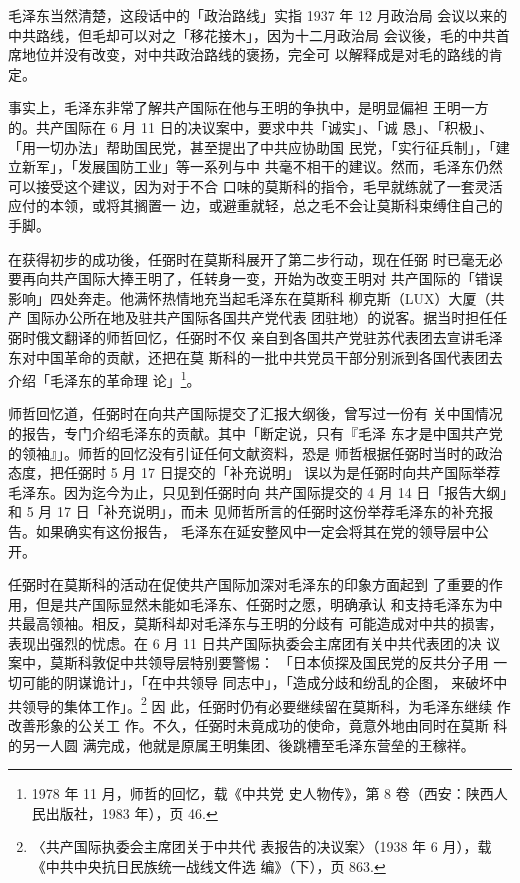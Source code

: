 毛泽东当然清楚，这段话中的「政治路线」实指 1937 年 12 月政治局
会议以来的中共路线，但毛却可以对之「移花接木」，因为十二月政治局
会议後，毛的中共首席地位并没有改变，对中共政治路线的褒扬，完全可
以解释成是对毛的路线的肯定。

事实上，毛泽东非常了解共产国际在他与王明的争执中，是明显偏袒
王明一方的。共产国际在 6 月 11 日的决议案中，要求中共「诚实」、「诚
恳」、「积极」、「用一切办法」帮助国民党，甚至提出了中共应协助国
民党，「实行征兵制」，「建立新军」，「发展国防工业」等一系列与中
共毫不相干的建议。然而，毛泽东仍然可以接受这个建议，因为对于不合
口味的莫斯科的指令，毛早就练就了一套灵活应付的本领，或将其搁置一
边，或避重就轻，总之毛不会让莫斯科束缚住自己的手脚。

在获得初步的成功後，任弼时在莫斯科展开了第二步行动，现在任弼 时已毫无必
要再向共产国际大捧王明了，任转身一变，开始为改变王明对 共产国际的「错误
影响」四处奔走。他满怀热情地充当起毛泽东在莫斯科 柳克斯（LUX）大厦（共产
国际办公所在地及驻共产国际各国共产党代表 团驻地）的说客。据当时担任任
弼时俄文翻译的师哲回忆，任弼时不仅 亲自到各国共产党驻苏代表团去宣讲毛泽
东对中国革命的贡献，还把在莫 斯科的一批中共党员干部分别派到各国代表团去
介绍「毛泽东的革命理 论」\footnote{1978 年 11 月，师哲的回忆，载《中共党
史人物传》，第 8 卷（西安：陕西人民出版社，1983 年），页 46.}。

师哲回忆道，任弼时在向共产国际提交了汇报大纲後，曾写过一份有
关中国情况的报告，专门介绍毛泽东的贡献。其中「断定说，只有『毛泽
东才是中国共产党的领袖』」。师哲的回忆没有引证任何文献资料，恐是
师哲根据任弼时当时的政治态度，把任弼时 5 月 17 日提交的「补充说明」
误以为是任弼时向共产国际举荐毛泽东。因为迄今为止，只见到任弼时向
共产国际提交的 4 月 14 日「报告大纲」和 5 月 17 日「补充说明」，而未
见师哲所言的任弼时这份举荐毛泽东的补充报告。如果确实有这份报告，
毛泽东在延安整风中一定会将其在党的领导层中公开。

任弼时在莫斯科的活动在促使共产国际加深对毛泽东的印象方面起到 了重要的作
用，但是共产国际显然未能如毛泽东、任弼时之愿，明确承认 和支持毛泽东为中
共最高领袖。相反，莫斯科却对毛泽东与王明的分歧有 可能造成对中共的损害，
表现出强烈的忧虑。在 6 月 11 日共产国际执委会主席团有关中共代表团的决
议案中，莫斯科敦促中共领导层特别要警惕： 「日本侦探及国民党的反共分子用
一切可能的阴谋诡计」，「在中共领导 同志中」，「造成分歧和纷乱的企图，
来破坏中共领导的集体工作」。\footnote{〈共产国际执委会主席团关于中共代
表报告的决议案〉（1938 年 6 月），载《中共中央抗日民族统一战线文件选
编》（下），页 863.} 因 此，任弼时仍有必要继续留在莫斯科，为毛泽东继续
作改善形象的公关工 作。不久，任弼时未竟成功的使命，竟意外地由同时在莫斯
科的另一人圆 满完成，他就是原属王明集团、後跳槽至毛泽东营垒的王稼祥。

